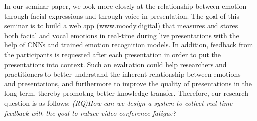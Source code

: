 In our seminar paper, we look more closely at the relationship between emotion through facial expressions and through voice in presentation. The goal of this seminar is to build a web app (\url{www.moody.digital}) that measures and stores both facial and vocal emotions in real-time during live presentations with the help of CNNs and trained emotion recognition models. In addition, feedback from the participants is requested after each presentation in order to put the presentations into context. Such an evaluation could help researchers and practitioners to better understand the inherent relationship between emotions and presentations, and furthermore to improve the quality of presentations in the long term, thereby promoting better knowledge transfer. Therefore, our research question is as follows:
\vspace{3mm}
\newline
\emph{(RQ)\quad How can we design a system to collect real-time feedback with the goal to reduce video conference fatigue?}
